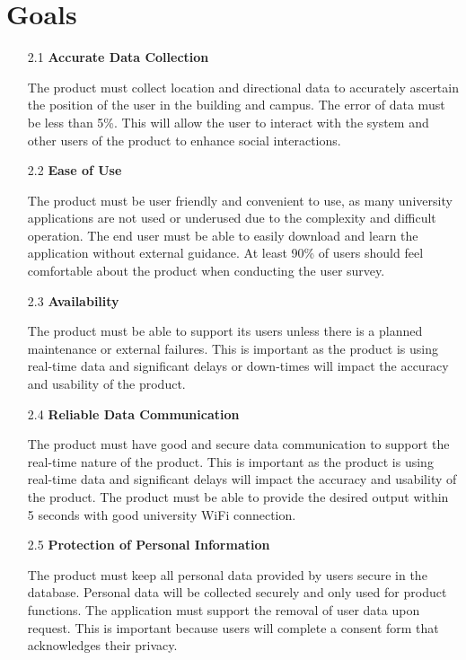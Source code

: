 \documentclass{article}
\begin{document}
\section{Goals}
\begin{itemize}
\item[2.1] \textbf{Accurate Data Collection}

The product must collect location and directional data to accurately ascertain the position of the user in the building and campus. The error of data must be less than 5\%. This will allow the user to interact with the system and other users of the product to enhance social interactions. 

\item[2.2] \textbf{Ease of Use}

The product must be user friendly and convenient to use, as many university applications are not used or underused due to the complexity and difficult operation. The end user must be able to easily download and learn the application without external guidance. At least 90\% of users should feel comfortable about the product when conducting the user survey.

\item[2.3] \textbf{Availability}

The product must be able to support its users unless there is a planned maintenance or external failures. This is important as the product is using real-time data and significant delays or down-times will impact the accuracy and usability of the product.

\item[2.4] \textbf{Reliable Data Communication}

The product must have good and secure data communication to support the real-time nature of the product. This is important as the product is using real-time data and significant delays will impact the accuracy and usability of the product. The product must be able to provide the desired output within 5 seconds with good university WiFi connection.

\item[2.5] \textbf{Protection of Personal Information}

The product must keep all personal data provided by users secure in the database. Personal data will be collected securely and only used for product functions. The application must support the removal of user data upon request. This is important because users will complete a consent form that acknowledges their privacy.


\end{itemize}
\end{document}
